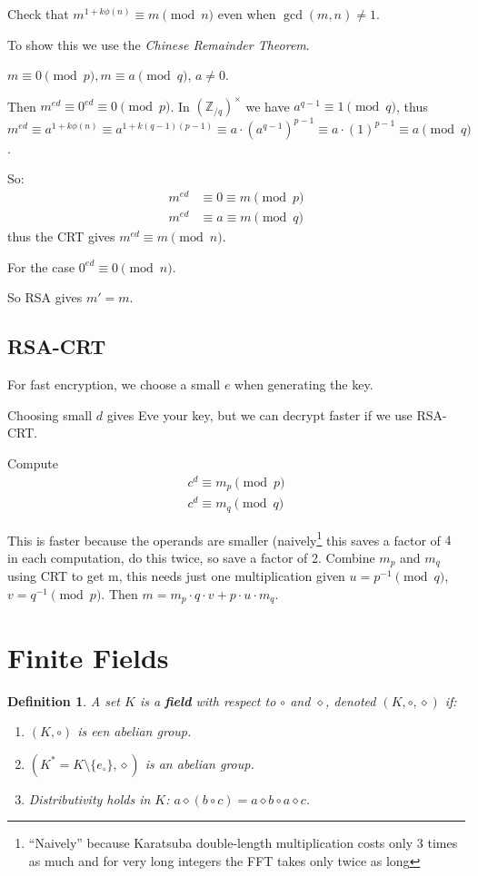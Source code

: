 \documentclass{article}
\newtheorem{definition}{Definition}
\newcommand{\ZZ}{\mathbb{Z}}
\newcommand{\ZZx}[1]{(\ZZ_{/#1})^\times}
\begin{document}
Check that $m^{1 + k\phi(n)} \equiv m \pmod{n}$ even when $\gcd(m, n) \ne 1$.

To show this we use the \emph{Chinese Remainder Theorem}.

$m \equiv 0 \pmod{p}, m \equiv a \pmod{q}$, $a \ne 0$.

Then $m^{ed} \equiv 0^{ed} \equiv 0 \pmod{p}$. In $\ZZx{q}$ we 
have $a^{q-1} \equiv 1 \pmod{q}$, thus $m^{ed} \equiv a^{1 + k\phi(n)} \equiv a^{1 + k(q-1)(p-1)}
\equiv a \cdot (a^{q-1})^{p-1} \equiv a \cdot (1)^{p-1} \equiv a \pmod{q}$.

So:
\begin{align*}
    m^{ed} &\equiv 0 \equiv m \pmod p \\
    m^{ed} &\equiv a \equiv m \pmod q 
\end{align*}
thus the CRT gives $m^{ed} \equiv m \pmod{n}$.

For the case $0^{ed} \equiv 0 \pmod{n}$.

So RSA gives $m' = m$.

\subsection{RSA-CRT}

For fast encryption, we choose a small $e$ when generating the key.

Choosing small $d$ gives Eve your key, but we can decrypt faster if we
use RSA-CRT.

Compute \begin{align*}
    c^d \equiv m_p \pmod p \\
    c^d \equiv m_q \pmod q
\end{align*}

This is faster because the operands are smaller (naively\footnote{``Naively''
because Karatsuba double-length multiplication costs only 3 times as much and
for very long integers the FFT takes only twice as long} this saves a factor of
$4$ in each computation, do this twice, so save a factor of 2. Combine $m_p$ and
$m_q$ using CRT to get m, this needs just one multiplication given $u = p^{-1}
\pmod q$, $v = q^{-1} \pmod p$. Then $m = m_p \cdot q \cdot v + p \cdot u \cdot
m_q$.

\section{Finite Fields}

\begin{definition}
    A set $K$ is a \textbf{field} with respect to $\circ$ and $\diamond$, denoted $(K, \circ, \diamond)$ if:

    \begin{enumerate}
        \item $(K, \circ)$ is een abelian group.
        \item $(K^* = K\setminus \{e_\circ\}, \diamond)$ is an abelian group.
        \item Distributivity holds in $K$: $a \diamond (b \circ c) = a \diamond b \circ a \diamond c$.
    \end{enumerate}

\end{definition}
\end{document}
